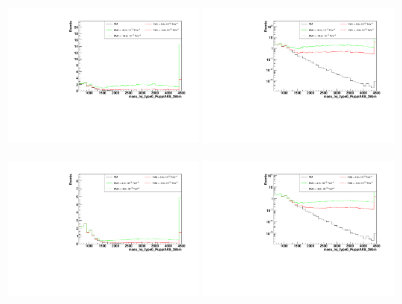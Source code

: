 \begin{figure}[h]
  \begin{center}
	\includegraphics[width=0.45\textwidth]{Plots/aQGC_kinematics/mass_lvj_type0_PuppiAK8_39bin_FM1.pdf}%
	\includegraphics[width=0.45\textwidth]{Plots/aQGC_kinematics/mass_lvj_type0_PuppiAK8_39bin_FM1_log.pdf}\\	
    \caption{}
  \end{center}
\end{figure}
\begin{figure}[h]
  \begin{center}
	\includegraphics[width=0.45\textwidth]{Plots/aQGC_kinematics/mass_lvj_type0_PuppiAK8_39bin_FM6.pdf}%
	\includegraphics[width=0.45\textwidth]{Plots/aQGC_kinematics/mass_lvj_type0_PuppiAK8_39bin_FM6_log.pdf}\\	
    \caption{}
  \end{center}
\end{figure}
